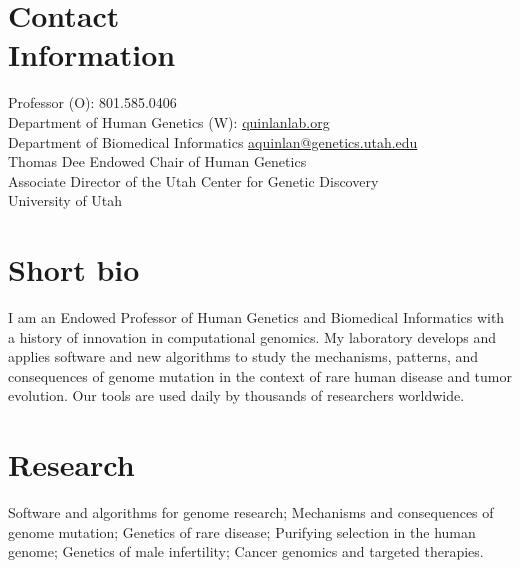 \documentclass[margin,line]{cv}
\begin{document}
\begin{resume}
    \section{\mysidestyle Contact\\Information}
    Professor                                                         \hfill (O): 801.585.0406\\%
    Department of Human Genetics                                                    \hfill (W): \url{quinlanlab.org}\\%
    Department of Biomedical Informatics                                     \hfill \url{aquinlan@genetics.utah.edu} \\%
    Thomas Dee Endowed Chair of Human Genetics                                                                       \\%
    Associate Director of the Utah Center for Genetic Discovery                                                      \\%
    University of Utah                                                                                       \hfill  \\%

    \section{\mysidestyle Short bio} I am an Endowed Professor of Human Genetics and Biomedical Informatics with a history of innovation in
    computational genomics. My laboratory develops and applies software and new algorithms to study the 
    mechanisms, patterns, and consequences of genome mutation in the context of rare human disease and tumor evolution. Our tools
    are used daily by thousands of researchers worldwide.

    \section{\mysidestyle Research} Software and algorithms for genome research; 
    Mechanisms and consequences of genome mutation;  Genetics of rare disease; 
    Purifying selection in the human genome; Genetics of male infertility; 
    Cancer genomics and targeted therapies.
    

\end{resume}
\end{document}
